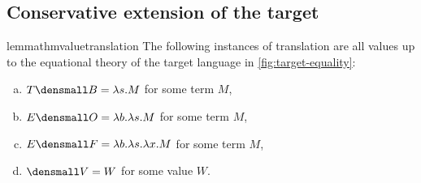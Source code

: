\allowdisplaybreaks

\subsection{Conservative extension of the target}

\begin{restatable}{lemma}{thmvaluetranslation}
  \label{l-value}
  \label{thm:value-translation}
  The following instances of translation are all values up to the equational
  theory of the target language in \cref{fig:target-equality}:
  \begin{enumerate}[(a)]
  \item $T\den{B} = \lambda s. M$ for some term $M$,
  \item $E\den{O} = \lambda b. \lambda s. M$ for some term $M$,
  \item $E\den{F} = \lambda b. \lambda s. \lambda x. M$ for some term $M$,
  \item $\den{V} = W$ for some value $W$.
  \end{enumerate}
\end{restatable}
